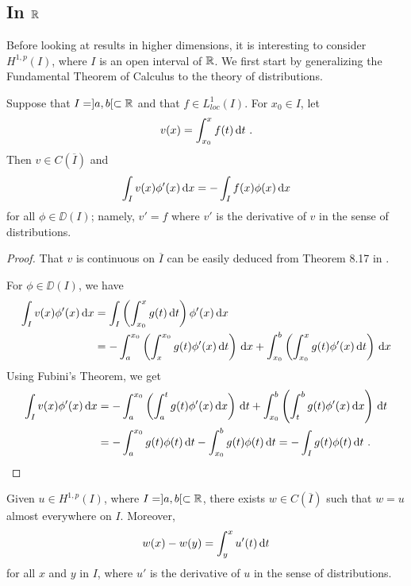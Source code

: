 \subsection{In $\mathbb{R}$}

Before looking at results in higher dimensions, it is interesting to
consider $\displaystyle H^{1,p}(I)$, where $I$ is an open interval
of $\mathbb{R}$.  We first start by generalizing the
Fundamental Theorem of Calculus to the theory of distributions.

\begin{lemma} \label{sob_ftc}
Suppose that $I = ]a,b[ \subset \mathbb{R}$ and that
$\displaystyle f \in L^1_{loc}(I)$.  For $x_0 \in I$, let
\[
v(x) = \int_{x_0}^x f(t) \dx{t} \ .
\]
Then $v \in C(\overline{I})$ and
\[
\int_I v(x) \phi'(x) \,\mathrm{d}{x} = - \int _I f(x) \phi(x) \,\mathrm{d}{x}
\]
for all $\phi \in \DD(I)$; namely, $v' = f$ where $v'$ is the
derivative of $v$ in the sense of distributions.
\end{lemma}

\begin{proof}
That $v$ is continuous on $\overline{I}$ can be easily deduced from
Theorem 8.17 in \cite{Ru}.

For $\phi \in \DD(I)$, we have
\begin{align*}
\int_I v(x) \phi'(x) \,\mathrm{d}{x} &= \int_I \left( \int_{x_0}^x g(t)
  \,\mathrm{d}{t} \right) \phi'(x) \,\mathrm{d}{x} \\
&= -\int_a^{x_0} \left( \int_x^{x_0} g(t) \phi'(x) \,\mathrm{d}{t}\right) \,\mathrm{d}{x}
+ \int_{x_0}^b \left( \int_{x_0}^x g(t) \phi'(x) \,\mathrm{d}{t}\right) \,\mathrm{d}{x}
\end{align*}
Using Fubini's Theorem, we get
\begin{align*}
\int_I v(x) \phi'(x) \dx{x} &=
-\int_a^{x_0} \left( \int_a^t g(t) \phi'(x) \dx{x}\right) \dx{t}
+ \int_{x_0}^b \left( \int_t^b g(t) \phi'(x) \dx{x}\right) \dx{t} \\
&= -\int_a^{x_0} g(t) \phi(t) \dx{t}
- \int_{x_0}^b g(t) \phi(t) \dx{t} = - \int_I g(t) \phi(t) \dx{t} \ .  \qedhere
\end{align*}
\end{proof}

\begin{theorem} \label{sob_ader}
Given $\displaystyle u \in H^{1,p}(I)$, where $I = ]a,b[ \subset \mathbb{R}$,
there exists $w \in C(\overline{I})$ such that $w=u$ almost everywhere on $I$.
Moreover,
\[
w(x) - w(y) = \int_y^x u'(t) \,\mathrm{d}{t}
\]
for all $x$ and $y$ in $I$, where $u'$ is the derivative of $u$ in
the sense of distributions.
\end{theorem}

